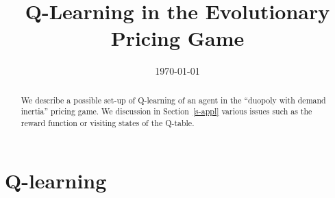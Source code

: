 \documentclass[a4paper,12pt]{article}  %
\title{%
Q-Learning in the Evolutionary Pricing Game
}
\author{
}
\date{\today
\\[1ex]
}
\theoremstyle{definition}
\begin{document}
\maketitle

\begin{abstract}
We describe a possible set-up of Q-learning of an agent in
the ``duopoly with demand inertia'' pricing game.
We discussion in Section~\ref{s-appl} various issues
such as the reward function or visiting states of the Q-table.

% 
% 
% 
% 
% 
% 
% 
% 
\end{abstract}

\section{Q-learning}
\end{document}
